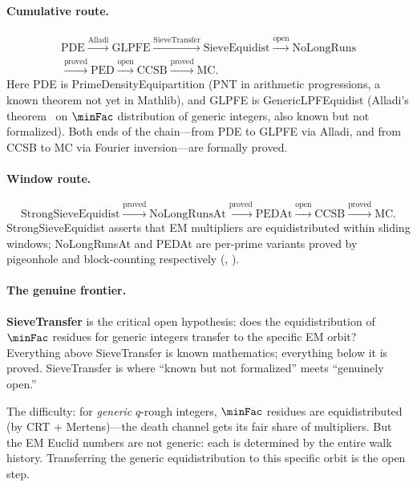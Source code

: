 \paragraph{Cumulative route.}
\begin{gather*}
\mathrm{PDE}
\xrightarrow{\text{Alladi}}
\mathrm{GLPFE}
\xrightarrow{\mathrm{SieveTransfer}}
\mathrm{SieveEquidist}
\xrightarrow{\text{open}}
\mathrm{NoLongRuns} \\
\xrightarrow{\text{proved}}
\mathrm{PED}
\xrightarrow{\text{open}}
\mathrm{CCSB}
\xrightarrow{\text{proved}}
\mathrm{MC}.
\end{gather*}
Here PDE is PrimeDensityEquipartition (PNT in arithmetic progressions,
a known theorem not yet in Mathlib), and GLPFE is GenericLPFEquidist
(Alladi's theorem~\cite{Alladi1977} on $\minFac$ distribution of generic integers,
also known but not formalized).  Both ends of the chain---from PDE to
GLPFE via Alladi, and from CCSB to MC via Fourier inversion---are
formally proved.

\paragraph{Window route.}
\[
\mathrm{StrongSieveEquidist}
\xrightarrow{\text{proved}}
\mathrm{NoLongRunsAt}
\xrightarrow{\text{proved}}
\mathrm{PEDAt}
\xrightarrow{\text{open}}
\mathrm{CCSB}
\xrightarrow{\text{proved}}
\mathrm{MC}.
\]
StrongSieveEquidist asserts that EM multipliers are equidistributed
within sliding windows; NoLongRunsAt and PEDAt are per-prime variants
proved by pigeonhole and block-counting respectively
(,
).

\paragraph{The genuine frontier.}

\textbf{SieveTransfer} is the critical open hypothesis: does the
equidistribution of $\minFac$ residues for generic integers transfer
to the specific EM orbit?  Everything above SieveTransfer is known
mathematics; everything below it is proved.  SieveTransfer is where
``known but not formalized'' meets ``genuinely open.''

The difficulty: for \emph{generic} $q$-rough integers,
$\minFac$ residues are equidistributed (by CRT + Mertens)---the
death channel gets its fair share of multipliers.  But the EM
Euclid numbers are not generic: each is determined by the entire
walk history.  Transferring the generic equidistribution to this
specific orbit is the open step.

